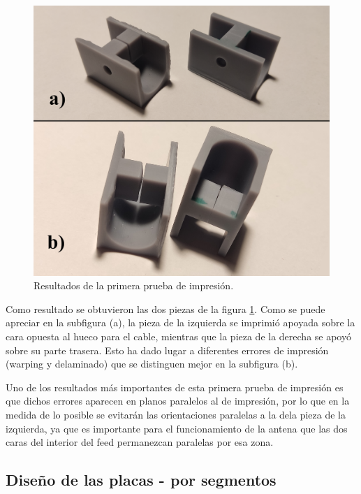 \documentclass[11pt,a4paper,twoside,pdf]{article}
\numberwithin{equation}{section}
\begin{document}
\begin{figure}
    \vspace{-0.5cm}
    \includegraphics[width=\linewidth]{img/fotos/print1Cmprsd.png}
    \caption{Resultados de la primera prueba de impresión.}
    \label{fig:print1}
\end{figure}
Como resultado se obtuvieron las dos piezas de la figura \ref{fig:print1}. Como se puede apreciar en la subfigura (a), la pieza de la izquierda se imprimió apoyada sobre la cara opuesta al hueco para el cable, mientras que la pieza de la derecha se apoyó sobre su parte trasera. Esto ha dado lugar a diferentes errores de impresión (warping y delaminado) que se distinguen mejor en la subfigura (b).

Uno de los resultados más importantes de esta primera prueba de impresión es que dichos errores aparecen en planos paralelos al de impresión, por lo que en la medida de lo posible se evitarán las orientaciones paralelas a la dela pieza de la izquierda, ya que es importante para el funcionamiento de la antena que las dos caras del interior del feed permanezcan paralelas por esa zona.

\subsection{Diseño de las placas - por segmentos}
\end{document}
